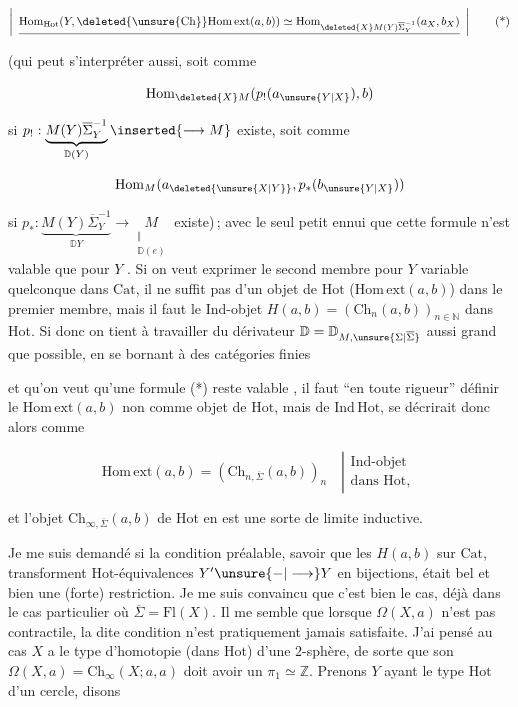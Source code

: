 \[
\left|\enspace\underline{\mathrm{Hom}_{\mathrm{Hot}}(Y,\deleted{\unsure{\mathrm{Ch}}}\mathrm{Hom\,ext}(a,b))\simeq\mathrm{Hom}_{\deleted{X}M(Y)\overline\Sigma_Y^{-1}}(a_X,b_X)}\enspace\right|
\tag*{(*)}
\]

(qui peut s'interpréter aussi, soit comme

\[
\mathrm{Hom}_{\deleted{X}M}(p_!(a_{\unsure{Y|X}}),b)
\]

si $p_!:\underbrace{M(Y)\overline\Sigma_Y^{-1}}_{\mathbb D(Y)}\inserted{\longrightarrow M}$ existe, soit comme

\[
\mathrm{Hom}_{M}(a_{\deleted{\unsure{X|Y}}},p_*(b_{\unsure{Y|X}}))
\]

si $p_*:\underbrace{M(Y)\overline\Sigma_Y^{-1}}_{\mathbb D Y}\longrightarrow\underset{\substack{\Vert\\ \mathbb D(e)}}{M}$ existe)\,; avec le seul petit ennui que cette formule n'est valable que pour $Y$ \uline{}. Si on veut exprimer le second membre pour $Y$ variable quelconque dans $\mathrm{Cat}$, il ne suffit pas d'un objet de $\mathrm{Hot}$ ($\mathrm{Hom\,ext}(a,b)$) dans le premier membre, mais il faut le Ind-objet $H(a,b)=(\mathrm{Ch}_n(a,b))_{n\in\mathbb N}$ dans $\mathrm{Hot}$. Si donc on tient à travailler    du dérivateur $\mathbb D=\mathbb D_{M,\unsure{\Sigma|\overline\Sigma}}$ aussi grand que possible, en se bornant  à des catégories finies


et qu'on veut qu'une formule (*) reste valable , il faut ``en toute rigueur'' définir le $\mathrm{Hom\,ext}(a,b)$ non comme objet de $\mathrm{Hot}$, mais de $\mathrm{Ind\,Hot}$,  se décrirait donc alors comme

\[
\mathrm{Hom\,ext}(a,b)=(\mathrm{Ch}_{n,\overline\Sigma}(a,b))_n
\quad\left|\begin{gathered}\text{Ind-objet}\\\text{dans }\mathrm{Hot},\end{gathered}\right.
\]

et l'objet $\mathrm{Ch}_{\infty,\overline\Sigma}(a,b)$ de $\mathrm{Hot}$ en est une sorte de limite inductive.

Je me suis demandé si la condition préalable, savoir que les  $H(a,b)$  sur $\mathrm{Cat}$, transforment $\mathrm{Hot}$-équivalences $Y'\unsure{-|\longrightarrow} Y$ en bijections, était bel et bien une (forte) restriction. Je me suis convaincu que c'est bien le cas, déjà dans le cas particulier où $\overline\Sigma=\mathrm{Fl}(X)$. Il me semble que lorsque  $\Omega(X,a)$ n'est  pas contractile, la dite condition n'est pratiquement jamais satisfaite. J'ai pensé  au cas   $X$ a le type  d'homotopie (dans $\mathrm{Hot}$) d'une $2$-sphère, de sorte que son $\Omega(X,a)=\mathrm{Ch}_\infty(X;a,a)$ doit avoir un $\pi_1\simeq\mathbb Z$. Prenons $Y$ ayant le type  $\mathrm{Hot}$ d'un cercle, disons

